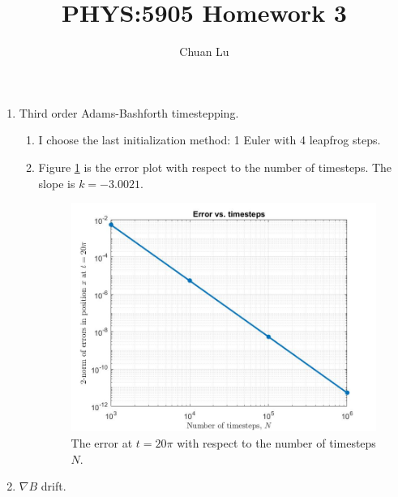 \documentclass{article}
\begin{document}
\author{Chuan Lu}
\title{PHYS:5905 Homework 3}
\maketitle

\medskip

\begin{enumerate}

\item
Third order Adams-Bashforth timestepping.

\begin{enumerate}
\item
I choose the last initialization method: 1 Euler with 4 leapfrog steps.

\item
Figure \ref{problem 1.2} is the error plot with respect to the number of timesteps. The slope is $k = -3.0021$.
\begin{figure}[h]
\centering
\vbox{
\includegraphics[scale=0.4]{problem1/error.jpg}
}
\caption{The error at $t = 20\pi$ with respect to the number of timesteps $N$.}
\label{problem 1.2}
\end{figure}

\end{enumerate}

\item
$\nabla B$ drift.


\end{enumerate}
\end{document}
